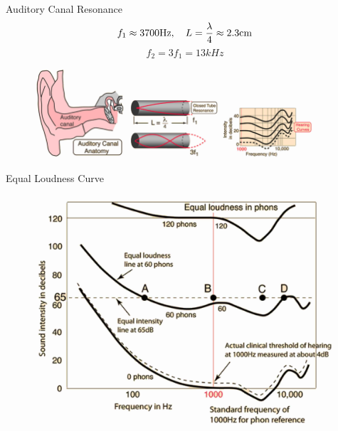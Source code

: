 \documentclass[9pt,mathserif]{beamer}
\begin{document}
\begin{frame}{Auditory Canal Resonance}
	$$f_1\approx 3700 \si{Hz}\qc L =\frac{\lambda}{4}\approx 2.3 \si{cm}$$
	$$f_2 = 3f_1 = 13 \si{kHz}$$

	\begin{figure}
		\centering
		\includegraphics[width=0.3\textwidth]{img/idealfluid/auditory_canal.jpg}
		\includegraphics[width=0.3\textwidth]{img/idealfluid/auditory_canal2.jpg}
		\includegraphics[width=0.3\textwidth]{img/idealfluid/auditory_canal3.jpg}
	\end{figure}
\end{frame}

\begin{frame}{Equal Loudness Curve}
	\begin{figure}
		\centering
		\includegraphics[height=0.85\textheight]{img/idealfluid/eqlou_ex.jpg}
	\end{figure}
\end{frame}
\end{document}
